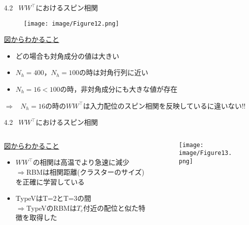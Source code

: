 \documentclass[dvipdfmx,8pt]{beamer}
\begin{document}
\begin{frame}[t]{4.2 \ $WW^{\top}$におけるスピン相関}
  \begin{figure}
    \begin{center}
      \texttt{[image: image/Figure12.png]}
    \end{center}
  \end{figure}
  \underline{図からわかること}
  \vspace{0.2cm}
  \begin{itemize}
    \item どの場合も対角成分の値は大きい
    \item $N_h=400$，$N_h=100$の時は対角行列に近い
    \item $N_h=16 < 100$の時，非対角成分にも大きな値が存在
  \end{itemize}
  \vspace{0.3cm}
  $\Rightarrow$ \ $N_h=16$の時の$WW^{\top}$は入力配位のスピン相関を反映しているに違いない!!
\end{frame}

\begin{frame}{4.2 \ $WW^{\top}$におけるスピン相関}
  \begin{columns}
    \begin{column}{0.4\textwidth}
      \underline{図からわかること}
      \vspace{0.2cm}
      \begin{itemize}
        \item $WW^{\top}$の相関は高温でより急速に減少\\
              $\Rightarrow$RBMは相関距離(クラスターのサイズ)を正確に学習している
              \vspace{0.5cm}
        \item TypeVはT=2とT=3の間\\
              $\Rightarrow$TypeVのRBMは$T_c$付近の配位と似た特徴を取得した
      \end{itemize}
    \end{column}
    \begin{column}{0.6\textwidth}
      \begin{figure}
        \begin{center}
          \texttt{[image: image/Figure13.png]}
        \end{center}
      \end{figure}
    \end{column}
  \end{columns}
\end{frame}
\end{document}
